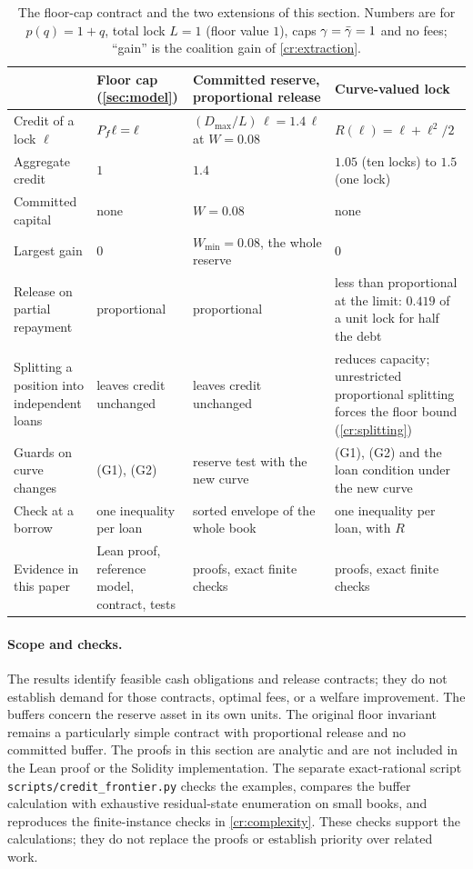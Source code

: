 \begin{table}[t]
\centering\small
\caption{The floor-cap contract and the two extensions of this section. Numbers are for $p(q)=1+q$, total lock $L=1$ (floor value $1$), caps $\gamma=\bar\gamma=1$ and no fees; ``gain'' is the coalition gain of \cref{cr:extraction}.}\label{tab:contracts}
\begin{tabularx}{\textwidth}{@{}>{\raggedright\arraybackslash}p{}>{\raggedright\arraybackslash}X>{\raggedright\arraybackslash}X>{\raggedright\arraybackslash}X@{}}
\toprule
 & Floor cap (\cref{sec:model}) & Committed reserve, proportional release & Curve-valued lock\\
\midrule
Credit of a lock $\ell$ & $P_f\ell=\ell$ & $(D_{\max}/L)\,\ell=1.4\,\ell$ at $W=0.08$ & $R(\ell)=\ell+\ell^2/2$\\
Aggregate credit & $1$ & $1.4$ & $1.05$ (ten locks) to $1.5$ (one lock)\\
Committed capital & none & $W=0.08$ & none\\
Largest gain & $0$ & $W_{\min}=0.08$, the whole reserve & $0$\\
Release on partial repayment & proportional & proportional & less than proportional at the limit: $0.419$ of a unit lock for half the debt\\
Splitting a position into independent loans & leaves credit unchanged & leaves credit unchanged & reduces capacity; unrestricted proportional splitting forces the floor bound (\cref{cr:splitting})\\
Guards on curve changes & (G1), (G2) & reserve test with the new curve & (G1), (G2) and the loan condition under the new curve\\
Check at a borrow & one inequality per loan & sorted envelope of the whole book & one inequality per loan, with $R$\\
Evidence in this paper & Lean proof, reference model, contract, tests & proofs, exact finite checks & proofs, exact finite checks\\
\bottomrule
\end{tabularx}
\end{table}

\paragraph{Scope and checks.}
The results identify feasible cash obligations and release contracts; they do not establish demand for those contracts, optimal fees, or a welfare improvement. The buffers concern the reserve asset in its own units. The original floor invariant remains a particularly simple contract with proportional release and no committed buffer. The proofs in this section are analytic and are not included in the Lean proof or the Solidity implementation. The separate exact-rational script \texttt{scripts/credit\_frontier.py} checks the examples, compares the buffer calculation with exhaustive residual-state enumeration on small books, and reproduces the finite-instance checks in \cref{cr:complexity}. These checks support the calculations; they do not replace the proofs or establish priority over related work.
